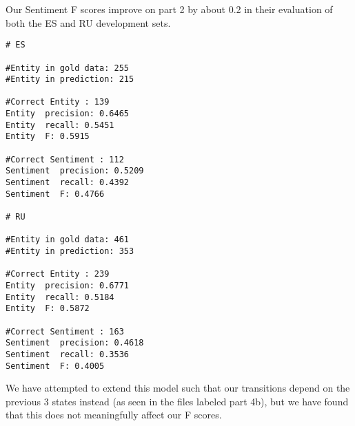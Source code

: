 \documentclass[
]{article}
\begin{document}
Our Sentiment F scores improve on part 2 by about 0.2 in their
evaluation of both the ES and RU development sets.

\begin{verbatim}
# ES

#Entity in gold data: 255
#Entity in prediction: 215

#Correct Entity : 139
Entity  precision: 0.6465
Entity  recall: 0.5451
Entity  F: 0.5915

#Correct Sentiment : 112
Sentiment  precision: 0.5209
Sentiment  recall: 0.4392
Sentiment  F: 0.4766

# RU

#Entity in gold data: 461
#Entity in prediction: 353

#Correct Entity : 239
Entity  precision: 0.6771
Entity  recall: 0.5184
Entity  F: 0.5872

#Correct Sentiment : 163
Sentiment  precision: 0.4618
Sentiment  recall: 0.3536
Sentiment  F: 0.4005
\end{verbatim}

We have attempted to extend this model such that our transitions depend
on the previous 3 states instead (as seen in the files labeled part 4b),
but we have found that this does not meaningfully affect our F scores.
\end{document}
